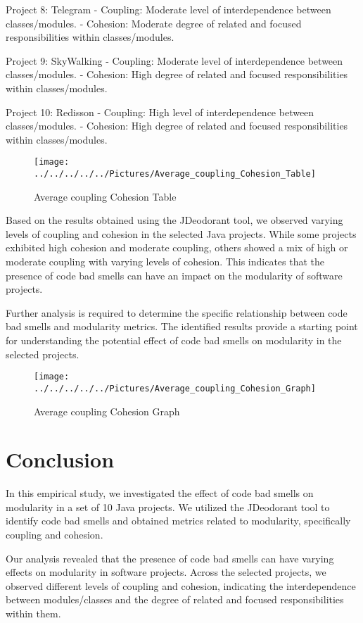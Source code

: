\documentclass[conference]{IEEEtran}
\begin{document}
	Project 8: Telegram
	- Coupling: Moderate level of interdependence between classes/modules.
	- Cohesion: Moderate degree of related and focused responsibilities within classes/modules.
	
	Project 9: SkyWalking
	- Coupling: Moderate level of interdependence between classes/modules.
	- Cohesion: High degree of related and focused responsibilities within classes/modules.
	
	Project 10: Redisson
	- Coupling: High level of interdependence between classes/modules.
	- Cohesion: High degree of related and focused responsibilities within classes/modules.
	
	\begin{figure}
		\centering
		\texttt{[image: ../../../../../Pictures/Average\_coupling\_Cohesion\_Table]}
		\caption{Average coupling Cohesion Table}
		\label{}
	\end{figure}
	
	Based on the results obtained using the JDeodorant tool, we observed varying levels of coupling and cohesion in the selected Java projects. While some projects exhibited high cohesion and moderate coupling, others showed a mix of high or moderate coupling with varying levels of cohesion. This indicates that the presence of code bad smells can have an impact on the modularity of software projects.
	
	Further analysis is required to determine the specific relationship between code bad smells and modularity metrics. The identified results provide a starting point for understanding the potential effect of code bad smells on modularity in the selected projects.
	
	\begin{figure}
		\centering
		\texttt{[image: ../../../../../Pictures/Average\_coupling\_Cohesion\_Graph]}
		\caption{Average coupling Cohesion Graph}
		\label{}
	\end{figure}	
	
	\section{Conclusion}
	In this empirical study, we investigated the effect of code bad smells on modularity in a set of 10 Java projects. We utilized the JDeodorant tool to identify code bad smells and obtained metrics related to modularity, specifically coupling and cohesion.
	
	Our analysis revealed that the presence of code bad smells can have varying effects on modularity in software projects. Across the selected projects, we observed different levels of coupling and cohesion, indicating the interdependence between modules/classes and the degree of related and focused responsibilities within them.
	
\end{document}
